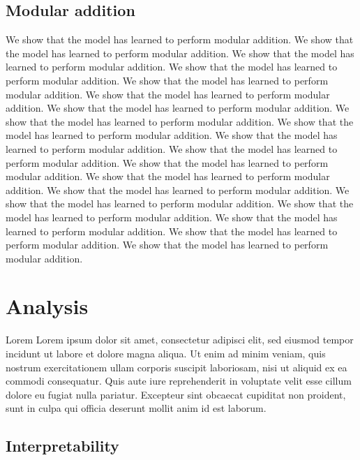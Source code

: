 \documentclass[11pt]{article} %
\begin{document}
\begin{multicols}{2}
  \subsection{Modular addition}\label{modular-addition}

  We show that the model has learned to perform modular addition. We
  show that the model has learned to perform modular addition. We show
  that the model has learned to perform modular addition. We show that
  the model has learned to perform modular addition. We show that the
  model has learned to perform modular addition. We show that the model
  has learned to perform modular addition. We show that the model has
  learned to perform modular addition. We show that the model has
  learned to perform modular addition. We show that the model has
  learned to perform modular addition. We show that the model has
  learned to perform modular addition. We show that the model has
  learned to perform modular addition. We show that the model has
  learned to perform modular addition. We show that the model has
  learned to perform modular addition. We show that the model has
  learned to perform modular addition. We show that the model has
  learned to perform modular addition. We show that the model has
  learned to perform modular addition. We show that the model has
  learned to perform modular addition. We show that the model has
  learned to perform modular addition. We show that the model has
  learned to perform modular addition.

  \section{Analysis}\label{analysis}

  Lorem Lorem ipsum dolor sit amet, consectetur adipisci elit, sed
  eiusmod tempor incidunt ut labore et dolore magna aliqua. Ut enim ad
  minim veniam, quis nostrum exercitationem ullam corporis suscipit
  laboriosam, nisi ut aliquid ex ea commodi consequatur. Quis aute iure
  reprehenderit in voluptate velit esse cillum dolore eu fugiat nulla
  pariatur. Excepteur sint obcaecat cupiditat non proident, sunt in
  culpa qui officia deserunt mollit anim id est laborum.


  \subsection{Interpretability}\label{interpretability}


\end{multicols}
\end{document}
